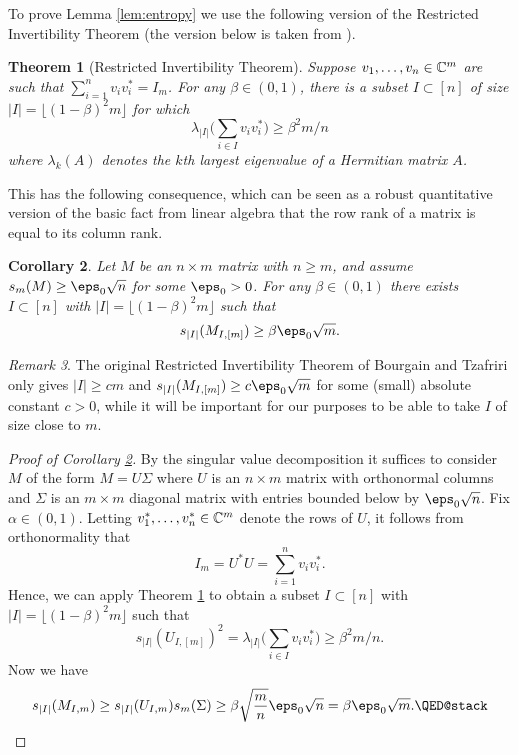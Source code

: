 \documentclass[aop,preprint]{imsart}
\theoremstyle{plain}
\newtheorem{theorem}{Theorem}[section]
\newtheorem{corollary}[theorem]{Corollary}
\theoremstyle{definition}
\theoremstyle{remark}
\newtheorem{remark}[theorem]{Remark}
\numberwithin{equation}{section}
\numberwithin{theorem}{section}
\def \lf {\lfloor}
\def \rf {\rfloor}
\begin{document}
To prove Lemma \ref{lem:entropy} we use the following version of the Restricted Invertibility Theorem \citep{SpSr:rit} (the version below is taken from \cite[Theorem 3.1]{MSS:icm}).

\begin{theorem}[Restricted Invertibility Theorem]	
\label{thm:rit}
Suppose $v_1,\dots, v_n\in {\mathbb C}^m$ are such that $\sum_{i=1}^n v_iv_i^* = I_m$. 
For any $\beta\in (0,1)$, there is a subset $I\subset [n]$ of size $|I|= \lf (1-\beta)^2m\rf$ for which
\begin{equation}
\lambda_{|I|}\bigg(\sum_{i\in I} v_iv_i^*\bigg) \ge \beta^2m/n
\end{equation}
where $\lambda_k(A)$ denotes the $k$th largest eigenvalue of a Hermitian matrix $A$.
\end{theorem}

This has the following consequence, which can be seen as a robust quantitative version of the basic fact from linear algebra that the row rank of a matrix is equal to its column rank.

\begin{corollary}	\label{cor:rit}
Let $M$ be an $n\times m$ matrix with $n\ge m$, and assume $s_m(M)\ge \eps_0\sqrt{n}$ for some $\eps_0>0$. 
For any $\beta\in (0,1)$ there exists $I\subset [n]$ with $|I|=\lf (1-\beta)^2 m\rf$ such that
\[
s_{|I|}(M_{I, [m]}) \ge \beta \eps_0\sqrt{m}.
\]
\end{corollary}

\begin{remark}
The original Restricted Invertibility Theorem of Bourgain and Tzafriri \citep{BoTz:rit} only gives $|I|\ge cm$ and $s_{|I|}(M_{I, [m]}) \ge c \eps_0\sqrt{m}$ for some (small) absolute constant $c>0$, while it will be important for our purposes to be able to take $I$ of size close to $m$.
\end{remark}

\begin{proof}[Proof of Corollary \ref{cor:rit}]
By the singular value decomposition it suffices to consider $M$ of the form
$
M=U\Sigma
$
where $U$ is an $n\times m$ matrix with orthonormal columns and $\Sigma$ is an $m\times m$ diagonal matrix with entries bounded below by $\eps_0\sqrt{n}$.
Fix $\alpha \in (0,1)$.
Letting $v_1^*,\dots, v_n^*\in {\mathbb C}^m$ denote the rows of $U$, it follows from orthonormality that
\[
I_m = U^*U = \sum_{i=1}^n v_iv_i^*.
\]
Hence, we can apply Theorem \ref{thm:rit} to obtain a subset $I\subset[n]$ with $|I|= \lf (1-\beta)^2m\rf$
such that 
\[
s_{|I|}(U_{I, [m]})^2 = \lambda_{|I|}\bigg( \sum_{i\in I} v_iv_i^*\bigg) \ge \beta^2m/n.
\]
Now we have
\[
s_{|I|}(M_{I, m}) \ge s_{|I|}(U_{I, m}) s_m(\Sigma) \ge \beta \sqrt{\frac{m}{n}} \eps_0\sqrt{n} = \beta\eps_0\sqrt{m}.\qedhere
\]
\end{proof}
\end{document}
